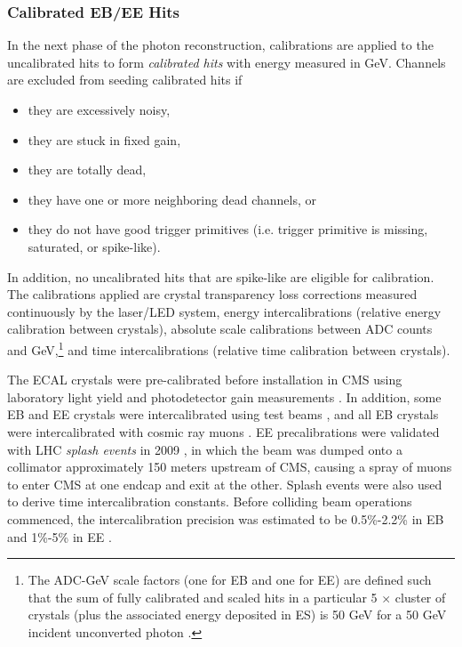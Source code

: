 \documentclass[dissertation.tex]{subfiles}
\begin{document}
\subsubsection{Calibrated EB/EE Hits}
\label{sec:Calibrated EB/EE Hits}

In the next phase of the photon reconstruction, calibrations are applied to the uncalibrated hits to form \textit{calibrated hits} with energy measured in GeV.  Channels are excluded from seeding calibrated hits if

\begin{itemize}
\item they are excessively noisy,
\item they are stuck in fixed gain,
\item they are totally dead,
\item they have one or more neighboring dead channels, or
\item they do not have good trigger primitives (i.e. trigger primitive is missing, saturated, or spike-like).
\end{itemize}
%
In addition, no uncalibrated hits that are spike-like are eligible for calibration.  The calibrations applied are crystal transparency loss corrections measured continuously by the laser/LED system, energy intercalibrations (relative energy calibration between crystals), absolute scale calibrations between ADC counts and GeV,\footnote{The ADC-GeV scale factors (one for EB and one for EE) are defined such that the sum of fully calibrated and scaled hits in a particular 5 $\times$ cluster of crystals (plus the associated energy deposited in ES) is 50 GeV for a 50 GeV incident unconverted photon \cite{calibration_IN}.} and time intercalibrations (relative time calibration between crystals).

The ECAL crystals were pre-calibrated before installation in CMS using laboratory light yield and photodetector gain measurements \cite{EB_performance_2006}.  In addition, some EB and EE crystals were intercalibrated using test beams \cite{EB_startup_intercalibration}, and all EB crystals were intercalibrated with cosmic ray muons \cite{CRAFT_calibration}.  EE precalibrations were validated with LHC \textit{splash events} in 2009 \cite{CRAFT_calibration, CRAFT_ECAL_performance}, in which the beam was dumped onto a collimator approximately 150 meters upstream of CMS, causing a spray of muons to enter CMS at one endcap and exit at the other.  Splash events were also used to derive time intercalibration constants.  Before colliding beam operations commenced, the intercalibration precision was estimated to be 0.5\%-2.2\% in EB and 1\%-5\% in EE \cite{CALOR_ECAL_calibration}.
\end{document}
